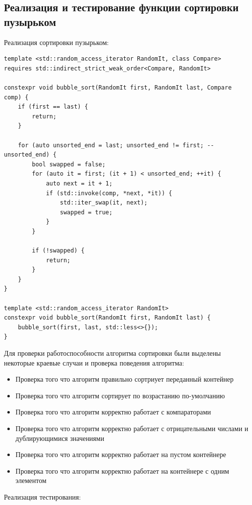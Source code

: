 \documentclass[12pt,a4paper]{report}
\begin{document}
\subsection*{Реализация и тестирование функции сортировки пузырьком}
Реализация сортировки пузырьком:
\begin{verbatim}
template <std::random_access_iterator RandomIt, class Compare>
requires std::indirect_strict_weak_order<Compare, RandomIt>

constexpr void bubble_sort(RandomIt first, RandomIt last, Compare comp) {
    if (first == last) {
        return;
    }

    for (auto unsorted_end = last; unsorted_end != first; --unsorted_end) {
        bool swapped = false;
        for (auto it = first; (it + 1) < unsorted_end; ++it) {
            auto next = it + 1;
            if (std::invoke(comp, *next, *it)) {
                std::iter_swap(it, next);
                swapped = true;
            }
        }

        if (!swapped) {
            return;
        }
    }
}

template <std::random_access_iterator RandomIt>
constexpr void bubble_sort(RandomIt first, RandomIt last) {
    bubble_sort(first, last, std::less<>{});
}
\end{verbatim}
Для проверки работоспособности алгоритма сортировки были выделены некоторые краевые случаи и проверка поведения алгоритма:
\begin{itemize}
    \item Проверка того что алгоритм правильно сортриует переданный контейнер
    \item Проверка того что алгоритм сортирует по возрастанию по-умолчанию
    \item Проверка того что алгоритм корректно работает с компараторами
    \item Проверка того что алгоритм корректно работает с отрицательными числами и дублирующимися значениями
    \item Проверка того что алгоритм корректно работает на пустом контейнере
    \item Проверка того что алгоритм корректно работает на контейнере с одним элементом
\end{itemize}
Реализация тестирования:
\end{document}
